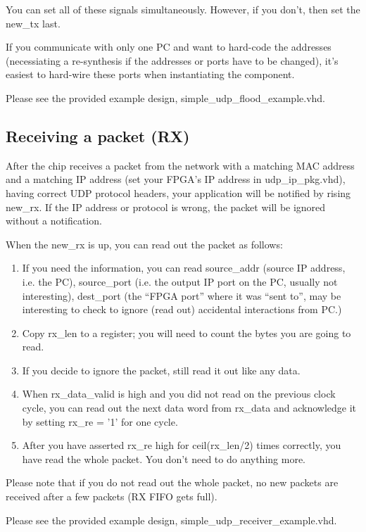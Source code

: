 \documentclass[a4paper,10pt,oneside,final]{article}
\begin{document}
You can set all of these signals simultaneously. However, if you don't,
then set the new\_tx last.

If you communicate with only one PC and want to hard-code the
addresses (necessiating a re-synthesis if the addresses or ports have
to be changed), it's easiest to hard-wire these ports when
instantiating the component.

Please see the provided example design, simple\_udp\_flood\_example.vhd.

\newpage
\subsection{Receiving a packet (RX)}

After the chip receives a packet from the network with a matching MAC
address and a matching IP address (set your FPGA's IP address in
udp\_ip\_pkg.vhd), having correct UDP protocol headers, your
application will be notified by rising new\_rx. If the IP address or
protocol is wrong, the packet will be ignored without a notification.

When the new\_rx is up, you can read out the packet as follows:
\begin{enumerate}
\item If you need the information, you can read source\_addr (source
  IP address, i.e. the PC), source\_port (i.e. the output IP port on
  the PC, usually not interesting), dest\_port (the ``FPGA port''
  where it was ``sent to'', may be interesting to check to ignore
  (read out) accidental interactions from PC.)
\item Copy rx\_len to a register; you will need to count the bytes you
  are going to read.
\item If you decide to ignore the packet, still read it out like any
  data.
\item When rx\_data\_valid is high and you did not read on the
  previous clock cycle, you can read out the next data word from
  rx\_data and acknowledge it by setting rx\_re = '1' for one cycle.
\item After you have asserted rx\_re high for ceil(rx\_len/2) times
  correctly, you have read the whole packet. You don't need to do
  anything more.
\end{enumerate}

Please note that if you do not read out the whole packet, no new
packets are received after a few packets (RX FIFO gets full).

Please see the provided example design, simple\_udp\_receiver\_example.vhd.
\end{document}
